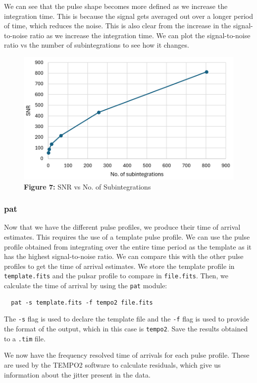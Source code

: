 \documentclass{article_saj}
\begin{document}
We can see that the pulse shape becomes more defined as we increase the integration time. This is because the signal gets averaged out over a longer period of time, which reduces the noise. This is also clear from the increase in the signal-to-noise ratio as we increase the integration time. We can plot the signal-to-noise ratio vs the number of subintegrations to see how it changes.

\begin{figure}[h!]
  \begin{center}
    \includegraphics[width=0.8\columnwidth]{Plots/snr.png}
    \caption*{\textbf{Figure 7:} SNR vs No. of Subintegrations}
  \end{center}
\end{figure}


\subsubsection{pat}
Now that we have the different pulse profiles, we produce their time of arrival estimates. This requires the use of a template pulse profile. We can use the pulse profile obtained from integrating over the entire time period as the template as it has the highest signal-to-noise ratio. We can compare this with the other pulse profiles to get the time of arrival estimates. We store the template profile in \texttt{template.fits} and the pulsar profile to compare in \texttt{file.fits}. Then, we calculate the time of arrival by using the \texttt{pat} module:
\begin{verbatim}
  pat -s template.fits -f tempo2 file.fits
\end{verbatim}
The \texttt{-s} flag is used to declare the template file and the \texttt{-f} flag is used to provide the format of the output, which in this case is \texttt{tempo2}. Save the results obtained to a \texttt{.tim} file. 

We now have the frequency resolved time of arrivals for each pulse profile. These are used by the TEMPO2 software to calculate residuals, which give us information about the jitter present in the data.
\end{document}
